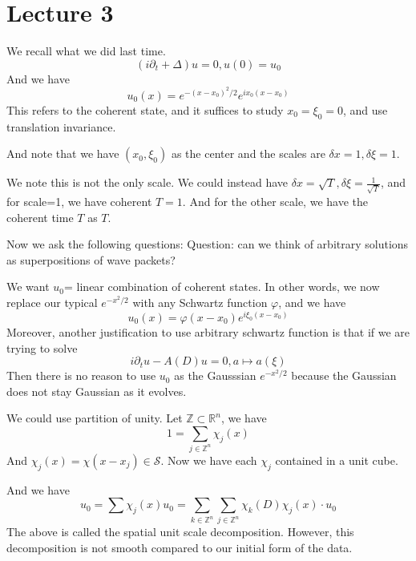 \section{Lecture 3}
We recall what we did last time.
\begin{equation*}
    (i\partial_t+\Delta)u=0, u(0)=u_0
\end{equation*}
And we have
\begin{equation*}
    u_0(x)=e^{-(x-x_0)^2/2}e^{ix_0(x-x_0)}
\end{equation*}
This refers to the coherent state, and it suffices to study $x_0=\xi_0=0$, and use translation invariance.


And note that we have $(x_0, \xi_0)$ as the center and the scales are $\delta x=1, \delta\xi=1$. 

We note this is not the only scale. We could instead have $\delta x=\sqrt{T}, \delta\xi=\frac{1}{\sqrt{T}}$, and for scale=1, we have coherent $T=1$. And for the other scale, we have the coherent time $T$ as $T$.

Now we ask the following questions:
Question: can we think of arbitrary solutions as superpositions of wave packets?

We want $u_0$= linear combination of coherent states. In other words, we now replace our typical $e^{-x^2/2}$ with any Schwartz function $\varphi$, and we have
\begin{equation*}
    u_0(x)=\varphi(x-x_0)e^{i\xi_0(x-x_0)}
\end{equation*}
Moreover, another justification to use arbitrary schwartz function is that if we are trying to solve
\begin{equation*}
    i\partial_tu-A(D)u=0, a\mapsto a(\xi)
\end{equation*}
Then there is no reason to use $u_0$ as the Gausssian $e^{-x^2/2}$ because the Gaussian does not stay Gaussian as it evolves.

We could use partition of unity. Let $\mathbb{Z}\subset\mathbb{R}^n$, we have
\begin{equation*}
    1=\sum_{j\in\mathbb{Z}^n}\chi_j(x)
\end{equation*}
And $\chi_j(x)=\chi(x-x_j)\in\mathcal{S}$. Now we have each $\chi_j$ contained in a unit cube.

And we have
\begin{equation*}
    u_0=\sum\chi_j(x)u_0=\sum_{k\in\mathbb{Z}^n}\sum_{j\in\mathbb{Z}^n}\chi_k(D)\chi_j(x)\cdot u_0
\end{equation*}
The above is called the spatial unit scale decomposition. However, this decomposition is not smooth compared to our initial form of the data.

